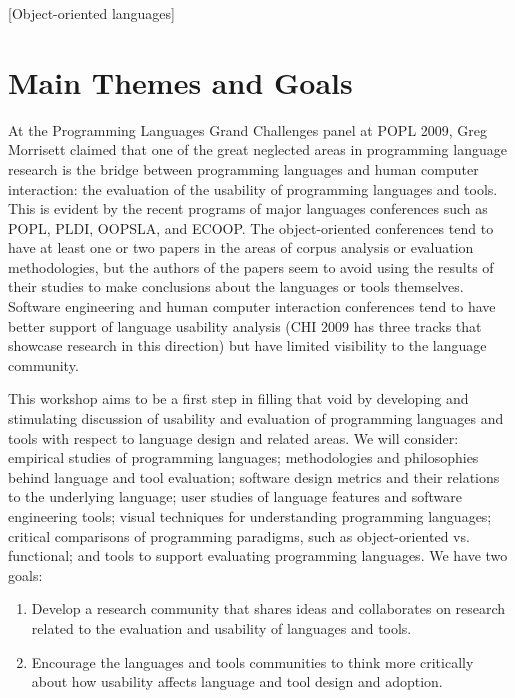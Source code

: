 \documentclass{acm_proc_article-sp}
\begin{document}
[Object-oriented languages]



\section{Main Themes and Goals}

At the Programming Languages Grand Challenges panel at POPL 2009, Greg
Morrisett claimed that one of the great neglected areas in programming
language research is the bridge between programming languages and human computer interaction:
the evaluation of the usability of programming languages and tools. This
is evident by the recent programs of major languages
conferences such as POPL, PLDI, OOPSLA, and ECOOP. The object-oriented
conferences tend to have at least one or two papers in the areas of
corpus analysis or evaluation methodologies, but the authors of the
papers seem to avoid using the results of their studies to make
conclusions about the languages or tools themselves. Software
engineering and human computer interaction conferences tend to have better support
of language usability analysis (CHI 2009 has three tracks that showcase research in
this direction) but have limited visibility to the language community.

This workshop aims to be a first step in filling that void by
developing and stimulating discussion of usability and evaluation of
programming languages and tools with respect to language design and
related areas.  We will consider: empirical studies of programming
languages; methodologies and philosophies behind language and tool
evaluation; software design metrics and their relations to the
underlying language; user studies of language features and software
engineering tools; visual techniques for understanding programming
languages; critical comparisons of programming paradigms, such as
object-oriented vs. functional; and tools to support evaluating
programming languages.  We have two goals:

\begin{enumerate}
  \item 
Develop a research community that shares ideas and collaborates on 
research related to the evaluation and usability of languages and tools.
\item
Encourage the languages and tools communities to think more critically
about how usability affects language and tool design and
adoption.
\end{enumerate}
\end{document}

